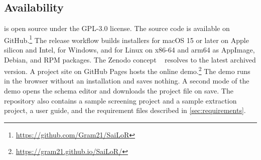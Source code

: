 \subsection{Availability}\label{sec:discussion-availability}

\SaiLoR is open source under the GPL-3.0 license.
The source code is available on GitHub.\footnote{\url{https://github.com/Gram21/SaiLoR}}
The release workflow builds installers for macOS 15 or later on Apple silicon and Intel, for Windows, and for Linux on x86-64 and arm64 as AppImage, Debian, and RPM packages.
The Zenodo concept \DOI~\cite{sailor2026zenodo} resolves to the latest archived version.
A project site on GitHub Pages hosts the online demo.\footnote{\url{https://gram21.github.io/SaiLoR/}}
The demo runs in the browser without an installation and saves nothing.
A second mode of the demo opens the schema editor and downloads the project file on save.
The repository also contains a sample screening project and a sample extraction project, a user guide, and the requirement files described in \autoref{sec:requirements}.
